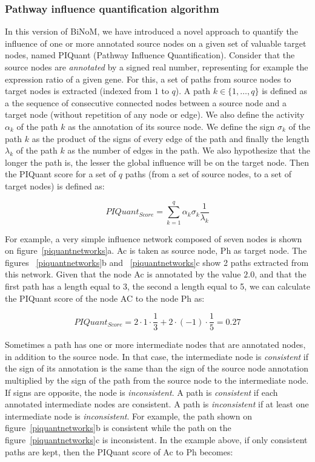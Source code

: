 \documentclass[10pt]{bmc_article}
\newenvironment{bmcformat}{\baselineskip20pt\sloppy\setboolean{publ}{false}}{\baselineskip20pt\sloppy}
\begin{document}
\begin{bmcformat}
\subsubsection*{Pathway influence quantification algorithm}
In this version of BiNoM, we have introduced a novel approach to quantify the
influence of one or more annotated source nodes on a given set of valuable target nodes, 
named PIQuant (Pathway Influence Quantification). Consider that the source nodes are 
 \textit{annotated} by a signed real number, representing for example the expression ratio 
of a given gene.
For this, a set of paths from source nodes to target nodes is extracted (indexed from $1$ to $q$). 
 A path $k \in \{1,\ldots , q\}$ is defined
as a the sequence of consecutive connected nodes
between a source node and a target node (without repetition of any node
or edge). We also define the activity $\alpha_k$ of the path $k$ as the annotation
of its source node. We define the sign $\sigma_k$
of the path $k$ as the product of the signs of every edge of the path and finally
the length $\lambda_k$ of the path $k$ as the number of edges in the path. We also
hypothesize that the longer the path is, the lesser the global influence will be
on the target node. Then the PIQuant score for a set of $q$ paths (from a set of 
source nodes, to a set of target nodes) is defined as:

$$
 PIQuant_{Score} = \sum_{k=1}^{q} \alpha_{k} \sigma_{k} \frac{1}{\lambda_{k}}
$$

For example, a very simple influence network composed of seven nodes is shown on
figure~\ref{piquantnetworks}a. Ac is taken as source node, Ph as target node. 
The figures ~\ref{piquantnetworks}b and
~\ref{piquantnetworks}c show 2 paths extracted from this network. Given that the
node Ac is annotated by the value $2.0$, and that the first path has a length
equal to 3, the second a length equal to 5, we can calculate the PIQuant score 
of the node AC to the node Ph as:

$$
 PIQuant_{Score} = 2 \cdot 1 \cdot \frac{1}{3} + 2 \cdot (-1) \cdot \frac{1}{5}
= 0.27
$$


Sometimes a path has one or more intermediate nodes that are annotated nodes, 
in addition to the source node.
In that case, the intermediate node is \textit{consistent} if the sign of its 
annotation is
the same than the sign of the source node annotation multiplied by the sign of the 
path from the source node
to the intermediate node. If signs are opposite, the node is \textit{inconsistent}. 
A path is \textit{consistent} if each annotated intermediate nodes are consistent. 
A path is \textit{inconsistent} if at least one intermediate node is \textit{inconsistent}.
For example, the path shown on figure~\ref{piquantnetworks}b is consistent while
the path on the figure~\ref{piquantnetworks}c is inconsistent. In the example
above, if only consistent paths 
are kept, then the PIQuant score of Ac to Ph becomes:


\end{bmcformat}
\end{document}
